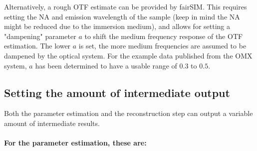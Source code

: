 \documentclass[twoside=false,
           twocolumn=false,
           a4paper,DIV=15,
           10pt]{scrartcl}
\begin{document}
\vspace{1em}

\begin{minipage}[t]{.48\linewidth}
Alternatively, a rough OTF estimate can be provided by fairSIM.
This requires setting the NA and emission wavelength of the 
sample (keep in mind the NA might be reduced due to the
 immersion medium), and allows for setting a "dampening" parameter
$a$ to shift the medium frequency response of the OTF estimation.
The lower $a$ is set, the more medium frequencies are assumed to
be dampened by the optical system. For the example data published
from the OMX system, $a$ has been determined to have a usable 
range of $0.3$ to $0.5$.
\end{minipage}%
\begin{minipage}[t]{.49\linewidth}
\end{minipage}







\subsection{Setting the amount of intermediate output}

Both the parameter estimation and the reconstruction step can output
a variable amount of intermediate results. 
\paragraph{For the parameter estimation,
these are:}
\end{document}
